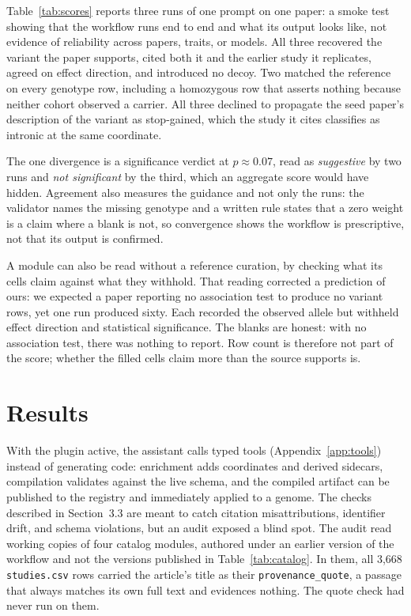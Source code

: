 \documentclass[11pt,a4paper]{article}
\begin{document}
Table~\ref{tab:scores} reports three runs of one prompt on one paper: a smoke
test showing that the workflow runs end to end and what its output looks like,
not evidence of reliability across papers, traits, or models. All
three recovered the variant the paper supports, cited both it and the
earlier study it replicates, agreed on effect direction, and introduced no
decoy. Two matched the reference on every genotype row, including a
homozygous row that asserts nothing because neither cohort observed a
carrier. All three declined to propagate the seed paper's description of
the variant as stop-gained, which the study it cites classifies as intronic
at the same coordinate.

The one divergence is a significance verdict at $p \approx 0.07$, read as
\emph{suggestive} by two runs and \emph{not significant} by the third, which
an aggregate score would have hidden. Agreement also measures the guidance and not only the runs: the
validator names the missing genotype and a written rule states that a zero
weight is a claim where a blank is not, so convergence shows the workflow
is prescriptive, not that its output is confirmed.

A module can also be read without a reference curation, by checking what its
cells claim against what they withhold. That reading
corrected a prediction of ours: we expected a paper reporting no association
test to produce no variant rows, yet one run produced sixty. Each recorded
the observed allele but withheld effect direction and statistical
significance. The blanks are honest: with no association test, there was
nothing to report. Row count is therefore not part of the score; whether the
filled cells claim more than the source supports is.

\section{Results}

\label{sec:checks}

With the plugin active, the assistant calls typed tools
(Appendix~\ref{app:tools}) instead of generating code: enrichment adds
coordinates and derived sidecars, compilation validates against the live
schema, and the compiled artifact can be published to the registry and
immediately applied to a genome. The checks described in
Section~3.3 are meant to catch citation misattributions, identifier drift, and
schema violations, but an audit exposed a blind spot. The audit read working copies of four
catalog modules, authored under an earlier version of the workflow and not the
versions published in Table~\ref{tab:catalog}. In them, all 3,668
\texttt{studies.csv} rows carried the article's title as their
\texttt{provenance\_quote}, a passage that always matches its own full text and
evidences nothing. The quote check had never run on them.
\end{document}
